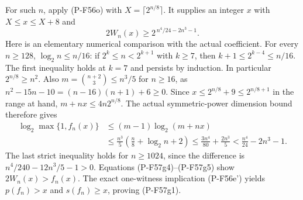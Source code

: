 For such $n$, apply (P-F56o) with
$X=\lceil2^{n/8}\rceil$.
It supplies an integer $x$ with
$X\le x\le X+8$ and
\[
                 2W_n(x)\ge
                   2^{\,n^4/24-2n^3-1}.
 \tag{P-F57g4}
\]
Here is an elementary numerical comparison with the actual
coefficient. For every $n\ge128$,
$\log_2n\le n/16$:
if $2^k\le n<2^{k+1}$ with $k\ge7$, then
$k+1\le2^{k-4}\le n/16$.
The first inequality holds at $k=7$ and persists by induction.
In particular $2^{n/8}\ge n^2$.
Also $m=\binom{n+2}3\le n^3/5$ for $n\ge16$,
as $n^2-15n-10=(n-16)(n+1)+6\ge0$.
Since $x\le2^{n/8}+9\le2^{n/8+1}$ in the range at hand,
$m+nx\le4n2^{n/8}$.
The actual symmetric-power dimension bound therefore gives
\[
 \begin{split}
 \log_2\max\{1,f_n(x)\}
 &\le (m-1)\log_2(m+nx)\\
 &\le\frac{n^3}{5}\left(\frac n8+\log_2n+2\right)
 \le\frac{3n^4}{80}+\frac{2n^3}{5}
 <\frac{n^4}{24}-2n^3-1 .
 \end{split}
 \tag{P-F57g5}
\]
The last strict inequality holds for $n\ge1024$, since
the difference is $n^4/240-12n^3/5-1>0$.
Equations (P-F57g4)--(P-F57g5) show
$2W_n(x)>f_n(x)$.
The exact one-witness implication (P-F56e') yields
$p(f_n)>x$ and $s(f_n)\ge x$, proving (P-F57g1).
